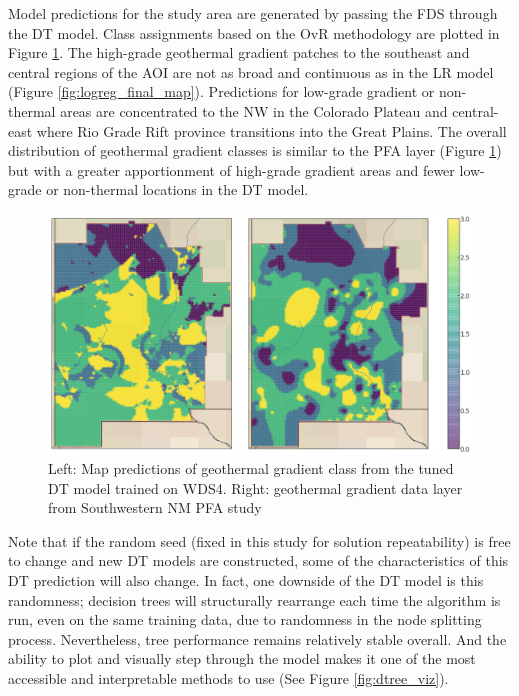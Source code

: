 Model predictions for the study area are generated by passing the FDS through the DT model. Class assignments based on the OvR methodology are plotted in Figure \ref{fig:dtree_final_map}. The high-grade geothermal gradient patches to the southeast and central regions of the AOI are not as broad and continuous as in the LR model (Figure \ref{fig:logreg_final_map}). Predictions for low-grade gradient or non-thermal areas are concentrated to the NW in the Colorado Plateau and central-east where Rio Grade Rift province transitions into the Great Plains. The overall distribution of geothermal gradient classes is similar to the \citet{bielicki_hydrogeolgic_2015} PFA layer (Figure \ref{fig:dtree_final_map}) but with a greater apportionment of high-grade gradient areas and fewer low-grade or non-thermal locations in the DT model.

\begin{figure}[!htp]
\centering
\includegraphics[width=\textwidth]{templates/images/Figure-DT-FinalMap_Joint.png}
\caption[Decision tree prediction map]{Left: Map predictions of geothermal gradient class from the tuned DT model trained on WDS4. Right: geothermal gradient data layer from Southwestern NM PFA study \protect\citep{bielicki_hydrogeolgic_2015}}
\label{fig:dtree_final_map}
\end{figure}

Note that if the random seed (fixed in this study for solution repeatability) is free to change and new DT models are constructed, some of the characteristics of this DT prediction will also change. In fact, one downside of the DT model is this randomness; decision trees will structurally rearrange each time the algorithm is run, even on the same training data, due to randomness in the node splitting process. Nevertheless, tree performance remains relatively stable overall. And the ability to plot and visually step through the model makes it one of the most accessible and interpretable methods to use (See Figure \ref{fig:dtree_viz}).


